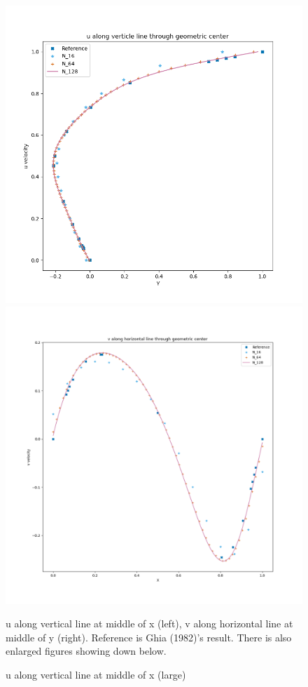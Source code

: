 \documentclass[12pt]{article}
\begin{document}
\begin{figure}[H]
    \centering
    \includegraphics[width=0.5\linewidth]{figures/u along verticle line through geometric center.png}
    \hspace{-8mm} %
    \includegraphics[width=0.5\linewidth]{figures/v along horizontal line through geometric center.png }
    \caption{u along vertical line at middle of x (left), v along horizontal line at middle of y (right). Reference is Ghia (1982)\cite{GHIA1982387}'s result. There is also enlarged figures showing down below.}
\end{figure}


\begin{figure}[H]
    \centering
    \caption{u along vertical line at middle of x (large)}
\end{figure}
\end{document}
